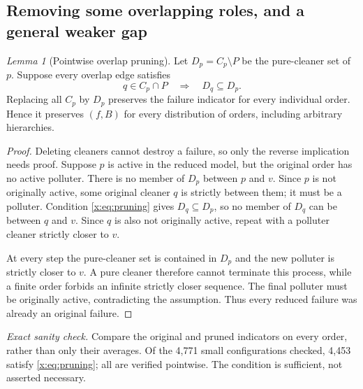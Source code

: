 \documentclass[11pt,a4paper]{article}
\theoremstyle{definition}\newtheorem{definition}[theorem]{Definition}
\theoremstyle{remark}\newtheorem{remark}[theorem]{Remark}
\newtheorem{xlemma}[xtheorem]{Lemma}
\theoremstyle{definition}\newtheorem{xexample}[xtheorem]{Example}\theoremstyle{plain}
\newcommand{\xcheck}[1]{\par\smallskip\textit{Exact sanity check.} #1\par}
\begin{document}
\subsection{Removing some overlapping roles, and a general weaker gap}

\begin{xlemma}[Pointwise overlap pruning]\label{x:lem:prune}
Let $D_p=C_p\setminus P$ be the pure-cleaner set of $p$. Suppose every overlap edge satisfies
\begin{equation}\label{x:eq:pruning}
q\in C_p\cap P\quad\Longrightarrow\quad D_q\subseteq D_p.
\end{equation}
Replacing all $C_p$ by $D_p$ preserves the failure indicator for every individual order. Hence it preserves $(f,B)$ for every distribution of orders, including arbitrary hierarchies.
\end{xlemma}
\begin{proof}
Deleting cleaners cannot destroy a failure, so only the reverse implication needs proof. Suppose $p$ is active in the reduced model, but the original order has no active polluter. There is no member of $D_p$ between $p$ and $v$. Since $p$ is not originally active, some original cleaner $q$ is strictly between them; it must be a polluter. Condition \eqref{x:eq:pruning} gives $D_q\subseteq D_p$, so no member of $D_q$ can be between $q$ and $v$. Since $q$ is also not originally active, repeat with a polluter cleaner strictly closer to $v$.

At every step the pure-cleaner set is contained in $D_p$ and the new polluter is strictly closer to $v$. A pure cleaner therefore cannot terminate this process, while a finite order forbids an infinite strictly closer sequence. The final polluter must be originally active, contradicting the assumption. Thus every reduced failure was already an original failure.
\end{proof}
\xcheck{Compare the original and pruned indicators on every order, rather than only their averages. Of the 4,771 small configurations checked, 4,453 satisfy \eqref{x:eq:pruning}; all are verified pointwise. The condition is sufficient, not asserted necessary.}
\end{document}
